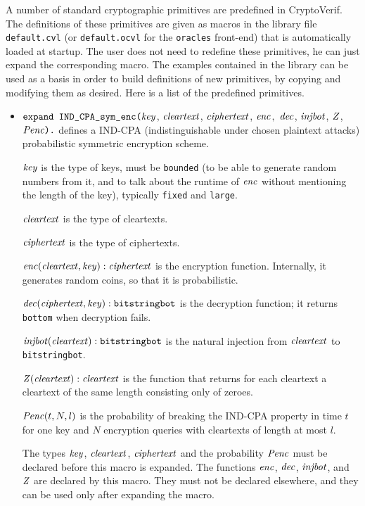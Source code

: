 \documentclass{article}
\begin{document}
A number of standard cryptographic primitives are predefined in
CryptoVerif.  The definitions of these primitives are given as macros
in the library file \texttt{default.cvl} (or \texttt{default.ocvl} for
the \texttt{oracles} front-end) that is automatically loaded at
startup.  The user does not need to redefine these primitives, he can
just expand the corresponding macro. The examples contained in the library
can be used as a basis in order to build definitions of new primitives, by copying
and modifying them as desired. Here is a list of the predefined primitives.
\begin{itemize}

\item $\texttt{expand IND\_CPA\_sym\_enc(}\mathit{key}$,
$  \mathit{cleartext}$, $\mathit{ciphertext}$, $\mathit{enc}$$,
$  $\mathit{dec}$, $\mathit{injbot}$, $\mathit{Z}$, $\mathit{Penc}\texttt{).}$ defines a
  IND-CPA (indistinguishable under chosen plaintext attacks)
  probabilistic symmetric encryption scheme.

   $\mathit{key}$ is the type of keys, must be \texttt{bounded} (to be able to generate random numbers from it, and to talk about the runtime of $\mathit{enc}$ without mentioning the length of the key), typically \texttt{fixed} and \texttt{large}.

   $\mathit{cleartext}$ is the type of cleartexts.

   $\mathit{ciphertext}$ is the type of ciphertexts.

   $\mathit{enc}(\mathit{cleartext}, \mathit{key}): \mathit{ciphertext}$ is the encryption function. Internally, it generates random coins, so that it is probabilistic.

   $\mathit{dec}(\mathit{ciphertext}, \mathit{key}): \texttt{bitstringbot}$ is the
  decryption function; it returns \texttt{bottom} when decryption
  fails.

   $\mathit{injbot}(\mathit{cleartext}): \texttt{bitstringbot}$ is the natural
  injection from $\mathit{cleartext}$ to \texttt{bitstringbot}.

   $\mathit{Z}(\mathit{cleartext}): \mathit{cleartext}$ is the function that
  returns for each cleartext a cleartext of the same length consisting
  only of zeroes.

  $\mathit{Penc}(t, N, l)$ is the probability of breaking the IND-CPA
  property in time $t$ for one key and $N$ encryption queries with
  cleartexts of length at most $l$.

   The types $\mathit{key}$, $\mathit{cleartext}$,
   $\mathit{ciphertext}$ and the probability $\mathit{Penc}$ must
   be declared before this macro is expanded. The functions
   $\mathit{enc}$, $\mathit{dec}$, $\mathit{injbot}$, and $\mathit{Z}$ are declared by this
   macro. They must not be declared elsewhere, and they can be used
   only after expanding the macro.


\end{itemize}
\end{document}
